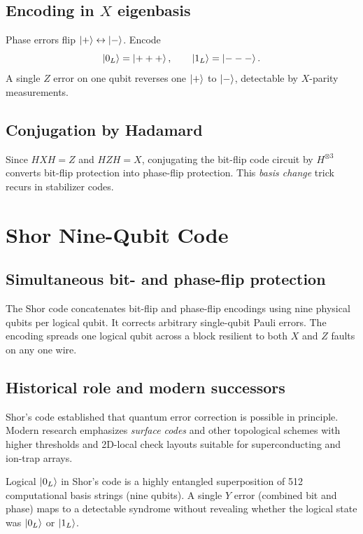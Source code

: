 \subsection{Encoding in $X$ eigenbasis}

Phase errors flip $\ket{+}\leftrightarrow\ket{-}$. Encode
\begin{equation}
\ket{0_L}=\ket{+++},\qquad \ket{1_L}=\ket{---}.
\label{eq:phaseflip-encoding}
\end{equation}
A single $Z$ error on one qubit reverses one $\ket{+}$ to $\ket{-}$, detectable by $X$-parity measurements.

\subsection{Conjugation by Hadamard}

Since $HXH=Z$ and $HZH=X$, conjugating the bit-flip code circuit by $H^{\otimes 3}$ converts bit-flip protection into phase-flip protection. This \emph{basis change} trick recurs in stabilizer codes.

\section{Shor Nine-Qubit Code}
\label{sec:shor}

\subsection{Simultaneous bit- and phase-flip protection}

The Shor code concatenates bit-flip and phase-flip encodings using nine physical qubits per logical qubit. It corrects arbitrary single-qubit Pauli errors. The encoding spreads one logical qubit across a block resilient to both $X$ and $Z$ faults on any one wire.

\subsection{Historical role and modern successors}

Shor's code established that quantum error correction is possible in principle. Modern research emphasizes \emph{surface codes} and other topological schemes with higher thresholds and 2D-local check layouts suitable for superconducting and ion-trap arrays.

\begin{example}
Logical $\ket{0_L}$ in Shor's code is a highly entangled superposition of 512 computational basis strings (nine qubits). A single $Y$ error (combined bit and phase) maps to a detectable syndrome without revealing whether the logical state was $\ket{0_L}$ or $\ket{1_L}$.
\end{example}

